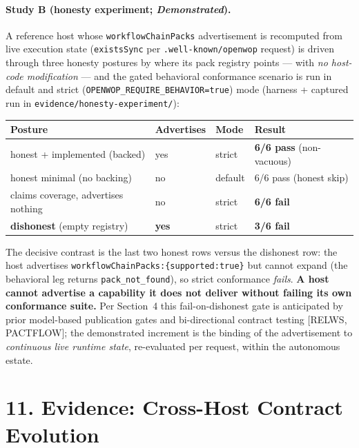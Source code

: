 \documentclass[11pt]{article}
\newcommand{\envreq}{\texttt{OPENWOP\_\allowbreak REQUIRE\_\allowbreak BEHAVIOR=true}}
\begin{document}
\paragraph{Study B (honesty experiment; \emph{Demonstrated}).} A reference host whose
\texttt{workflowChainPacks} advertisement is recomputed from live execution state
(\texttt{existsSync} per \texttt{.well-known/}\allowbreak\texttt{openwop} request) is driven through
three honesty postures by where its pack registry points --- with \emph{no host-code modification} ---
and the gated behavioral conformance scenario is run in default and strict
(\envreq) mode (harness + captured run in
\texttt{evidence/}\allowbreak\texttt{honesty-experiment/}):
\begin{center}\small
\begin{tabular}{llll}
\textbf{Posture} & \textbf{Advertises} & \textbf{Mode} & \textbf{Result}\\\hline
honest + implemented (backed) & yes & strict & \textbf{6/6 pass} (non-vacuous)\\
honest minimal (no backing) & no & default & 6/6 pass (honest skip)\\
claims coverage, advertises nothing & no & strict & \textbf{6/6 fail}\\
\textbf{dishonest} (empty registry) & \textbf{yes} & strict & \textbf{3/6 fail}\\
\end{tabular}
\end{center}
The decisive contrast is the last two honest rows versus the dishonest row: the host advertises
\texttt{workflowChainPacks:\{supported:true\}} but cannot expand (the behavioral leg returns
\texttt{pack\_not\_found}), so strict conformance \emph{fails}. \textbf{A host cannot advertise a
capability it does not deliver without failing its own conformance suite.} Per Section~4 this
fail-on-dishonest gate is anticipated by prior model-based publication gates and bi-directional
contract testing [RELWS, PACTFLOW]; the demonstrated increment is the binding of the advertisement
to \emph{continuous live runtime state}, re-evaluated per request, within the autonomous estate.

\section*{11. Evidence: Cross-Host Contract Evolution}
\end{document}
